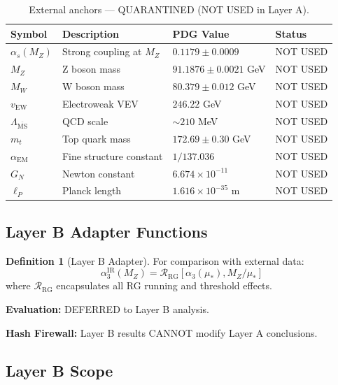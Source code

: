 \documentclass[11pt,a4paper]{article}
\theoremstyle{definition}
\newtheorem{definition}{Definition}[section]
\begin{document}
\begin{table}[ht]
\centering
\caption{External anchors --- QUARANTINED (NOT USED in Layer A).}
\label{tab:external-anchors}
\begin{tabular}{llll}
\toprule
Symbol & Description & PDG Value & Status \\
\midrule
$\alpha_s(M_Z)$ & Strong coupling at $M_Z$ & $0.1179 \pm 0.0009$ & NOT USED \\
$M_Z$ & Z boson mass & $91.1876 \pm 0.0021$ GeV & NOT USED \\
$M_W$ & W boson mass & $80.379 \pm 0.012$ GeV & NOT USED \\
$v_{\text{EW}}$ & Electroweak VEV & $246.22$ GeV & NOT USED \\
$\Lambda_{\overline{\text{MS}}}$ & QCD scale & $\sim 210$ MeV & NOT USED \\
$m_t$ & Top quark mass & $172.69 \pm 0.30$ GeV & NOT USED \\
$\alpha_{\text{EM}}$ & Fine structure constant & $1/137.036$ & NOT USED \\
$G_N$ & Newton constant & $6.674 \times 10^{-11}$ & NOT USED \\
$\ell_P$ & Planck length & $1.616 \times 10^{-35}$ m & NOT USED \\
\bottomrule
\end{tabular}
\end{table}

\subsection{Layer B Adapter Functions}
\label{subsec:adapter-functions}

\begin{definition}[Layer B Adapter]
\label{def:layer-b-adapter}
For comparison with external data:
\begin{equation}
\label{eq:adapter-function}
\alpha_3^{\text{IR}}(M_Z) = \mathcal{R}_{\text{RG}}[\alpha_3(\mu_*), M_Z/\mu_*]
\end{equation}
where $\mathcal{R}_{\text{RG}}$ encapsulates all RG running and threshold effects.
\end{definition}

\textbf{Evaluation:} DEFERRED to Layer B analysis.

\textbf{Hash Firewall:} Layer B results CANNOT modify Layer A conclusions.

\subsection{Layer B Scope}
\label{subsec:layer-b-scope}
\end{document}

